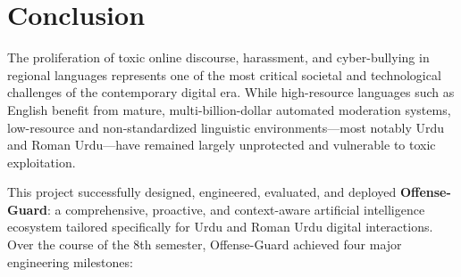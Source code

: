\documentclass[A4paper,12pt]{report}
\theoremstyle{plain}
\theoremstyle{definition}
\theoremstyle{remark}
\numberwithin{equation}{section}
\begin{document}
\section{Conclusion}
The proliferation of toxic online discourse, harassment, and cyber-bullying in regional languages represents one of the most critical societal and technological challenges of the contemporary digital era. While high-resource languages such as English benefit from mature, multi-billion-dollar automated moderation systems, low-resource and non-standardized linguistic environments---most notably Urdu and Roman Urdu---have remained largely unprotected and vulnerable to toxic exploitation.

This project successfully designed, engineered, evaluated, and deployed \textbf{Offense-Guard}: a comprehensive, proactive, and context-aware artificial intelligence ecosystem tailored specifically for Urdu and Roman Urdu digital interactions. Over the course of the 8th semester, Offense-Guard achieved four major engineering milestones:
\end{document}
